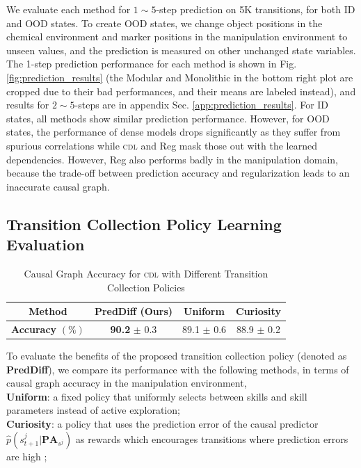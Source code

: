 We evaluate each method for $1 \sim 5$-step prediction on 5K transitions, for both ID and OOD states. To create OOD states, we change object positions in the chemical environment and marker positions in the manipulation environment to unseen values, and the prediction is measured on other unchanged state variables. The 1-step prediction performance for each method is shown in Fig. \ref{fig:prediction_results} (the Modular and Monolithic in the bottom right plot are cropped due to their bad performances, and their means are labeled instead), and results for $2 \sim 5$-steps are in appendix Sec. \ref{app:prediction_results}. For ID states, all methods show similar prediction performance. However, for OOD states, the performance of dense models drops significantly as they suffer from spurious correlations while \textsc{cdl} and Reg mask those out with the learned dependencies. However, Reg also performs badly in the manipulation domain, because the trade-off between prediction accuracy and regularization leads to an inaccurate causal graph.


\subsection{Transition Collection Policy Learning Evaluation}
\label{subsec:data_collection_policy_results}

\begin{table}
\centering
\begin{small}
\caption{Causal Graph Accuracy for \textsc{cdl} with Different Transition Collection Policies}
\begin{tabular}{cccc}
\toprule
\textbf{Method}             & \textbf{PredDiff} (Ours) & \textbf{Uniform} & \textbf{Curiosity} \\
\midrule
\textbf{Accuracy} $(\%)$    & \textbf{90.2} $\pm$ 0.3 & 89.1 $\pm$ 0.6 & 88.9 $\pm$ 0.2 \\
\bottomrule
\end{tabular}
\end{small}
\vspace{-20pt}
\label{tab:policy_results}
\end{table}

To evaluate the benefits of the proposed transition collection policy (denoted as \textbf{PredDiff}), we compare its performance with the following methods, in terms of causal graph accuracy in the manipulation environment, \\
\textbf{Uniform}: a fixed policy that uniformly selects between skills and skill parameters instead of active exploration;\\
\textbf{Curiosity}: a policy that uses the prediction error of the causal predictor $\hat{p}(s^j_{t+1} | \textbf{PA}_{s^j})$ as rewards which encourages transitions where prediction errors are high \cite{pathak2017curiosity};

